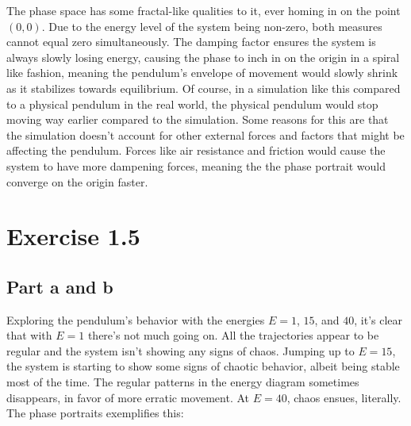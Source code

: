 \documentclass[a4paper,12pt]{article}
\begin{document}
The phase space has some fractal-like qualities to it, ever homing in on the point $(0, 0)$. Due to the energy level of
the system being non-zero, both measures cannot equal zero simultaneously. The damping factor ensures the system is always
slowly losing energy, causing the phase to inch in on the origin in a spiral like fashion, meaning the pendulum's envelope
of movement would slowly shrink as it stabilizes towards equilibrium. Of course, in a simulation like this compared to
a physical pendulum in the real world, the physical pendulum would stop moving way earlier compared to the simulation.
Some reasons for this are that the simulation doesn't account for other external forces and factors that might be affecting
the pendulum. Forces like air resistance and friction would cause the system to have more dampening forces, meaning the
the phase portrait would converge on the origin faster.

\section*{Exercise 1.5}

\subsection*{Part a and b}

Exploring the pendulum's behavior with the energies $E = 1$, $15$, and $40$, it's clear that with $E = 1$ there's
not much going on. All the trajectories appear to be regular and the system isn't showing any signs of chaos. Jumping
up to $E = 15$, the system is starting to show some signs of chaotic behavior, albeit being stable most of the time.
The regular patterns in the energy diagram sometimes disappears, in favor of more erratic movement. At $E = 40$, chaos
ensues, literally. The phase portraits exemplifies this:
\end{document}
